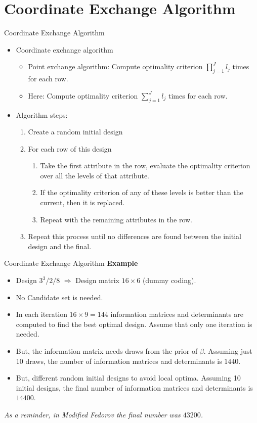 \documentclass[11pt,t]{beamer}
\begin{document}
\section{Coordinate Exchange Algorithm}
\begin{frame}[fragile]{Coordinate Exchange Algorithm}
\begin{itemize}
	\item Coordinate exchange algorithm
	\begin{itemize}
		\item Point exchange algorithm: Compute optimality criterion $\prod_{j=1}^J l_j$ times for each row.
		\item Here: Compute optimality criterion $\sum_{j=1}^J l_j$ times for each row.
	\end{itemize}
	\item Algorithm steps:
	\begin{enumerate}
		\item Create a random initial design
		\item For each row of this design
		\begin{enumerate}
			\item Take the first attribute in the row, evaluate the optimality criterion over all the levels of that attribute.
			\item If the optimality criterion of any of these levels is better than the current, then it is replaced.
			\item Repeat with the remaining attributes in the row.
		\end{enumerate}
		\item Repeat this process until no differences are found between the initial design and the final.
	\end{enumerate}
\end{itemize}
\end{frame}

\begin{frame}[fragile]{Coordinate Exchange Algorithm}
\textbf{Example}\\
\begin{itemize}
	\item Design $3^3/2/8$ $\Rightarrow$ Design matrix $16 \times 6$ (dummy coding).
	\item No Candidate set is needed.
	\item In each iteration $16 \times 9 = 144$ information matrices and determinants are computed to find the best optimal design. Assume that only one iteration is needed.
	\item But, the information matrix needs draws from the prior of $\beta$. Assuming just 10 draws, the number of information matrices and determinants is $1440$.
	\item But, different random initial designs to avoid local optima. Assuming 10 initial designs, the final number of information matrices and determinants is $14400$.
\end{itemize}	
\small{\textit{As a reminder, in Modified Fedorov the final number was $43200$.}}
\end{frame}
\end{document}
